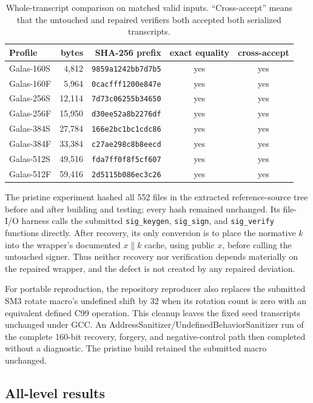 \documentclass[11pt,a4paper]{article}
\begin{document}
\begin{table}[ht]
\centering
\caption{Whole-transcript comparison on matched valid inputs.  ``Cross-accept''
means that the untouched and repaired verifiers both accepted both serialized
transcripts.}
\label{tab:transcripts}
\begin{tabular}{lrrcc}
\toprule
Profile & bytes & SHA-256 prefix & exact equality & cross-accept\\
\midrule
Galas-160S &  4,812 & \texttt{9859a1242bb7d7b5} & yes & yes\\
Galas-160F &  5,964 & \texttt{0cacfff1200e847e} & yes & yes\\
Galas-256S & 12,114 & \texttt{7d73c06255b34650} & yes & yes\\
Galas-256F & 15,950 & \texttt{d30ee52a8b2276df} & yes & yes\\
Galas-384S & 27,784 & \texttt{166e2bc1bc1cdc86} & yes & yes\\
Galas-384F & 33,384 & \texttt{c27ae298c8b8eecd} & yes & yes\\
Galas-512S & 49,516 & \texttt{fda7ff0f8f5cf607} & yes & yes\\
Galas-512F & 59,416 & \texttt{2d5115b086ec3c26} & yes & yes\\
\bottomrule
\end{tabular}
\end{table}

The pristine experiment hashed all 552 files in the extracted reference-source
tree before and after building and testing; every hash remained unchanged.  Its
file-I/O harness calls the submitted \texttt{sig\_keygen}, \texttt{sig\_sign}, and
\texttt{sig\_verify} functions directly.  After recovery, its only conversion is
to place the normative $k$ into the wrapper's documented $x\mathbin\|k$ cache,
using public $x$, before calling the untouched signer.  Thus neither recovery nor
verification depends materially on the repaired wrapper, and the defect is not
created by any repaired deviation.

For portable reproduction, the repository reproducer also replaces the
submitted SM3 rotate macro's undefined shift by 32 when its rotation count is
zero with an equivalent defined C99 operation.  This cleanup leaves the fixed
seed transcripts unchanged under GCC.  An AddressSanitizer/UndefinedBehaviorSanitizer
run of the complete 160-bit recovery, forgery, and negative-control path then
completed without a diagnostic.  The pristine build retained the submitted macro
unchanged.

\subsection{All-level results}
\end{document}
